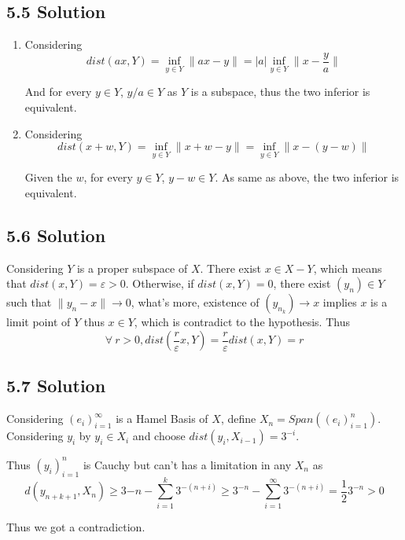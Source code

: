 \documentclass{article}
\begin{document}
\subsection*{5.5 Solution}
\begin{enumerate}
\item Considering 
\[dist(ax, Y) = \inf_{y \in Y} \|ax - y\| = |a| \inf_{y \in Y} \|x - \frac{y}{a}\|\]

And for every \(y \in Y\), \(y/a \in Y\) as \(Y\) is a subspace, thus the two inferior is equivalent. 

\item Considering
\[dist(x + w, Y) = \inf_{y \in Y}\|x + w - y\| = \inf_{y \in Y}\|x - (y - w)\|\]

Given the \(w\), for every \(y \in Y\), \(y - w \in Y\). As same as above, the two inferior is equivalent.


\end{enumerate}


\subsection*{5.6 Solution}
Considering \(Y\) is a proper subspace of \(X\). There exist \(x \in X - Y\), which means that \(dist(x, Y) = \varepsilon > 0\). Otherwise, if \(dist(x, Y) = 0\), there exist \((y_n) \in Y\) such that \(\|y_n - x\| \to 0\), what's more, existence of \((y_{n_k}) \to x\) implies \(x\) is a limit point of \(Y\) thus \(x \in Y\), which is contradict to the hypothesis. Thus 
\[\forall\ r > 0, dist(\frac{r}{\varepsilon}x, Y) = \frac{r}{\varepsilon}dist(x, Y) = r\]

\subsection*{5.7 Solution}
Considering \((e_i)_{i = 1}^\infty\) is a Hamel Basis of \(X\), define \(X_n = Span((e_i)_{i = 1}^n)\). Considering \(y_i\) by \(y_i \in X_i\) and choose \(dist(y_i, X_{i - 1}) = 3^{-i}\). 

Thus \((y_i)_{i = 1}^n\) is Cauchy but can't has a limitation in any \(X_n\) as 
\[d(y_{n + k + 1}, X_n) \ge 3{-n} - \sum_{i = 1}^k 3^{-(n + i)} \ge 3^{-n} - \sum_{i = 1}^\infty 3^{-(n + i)} = \frac{1}{2} 3^{-n} > 0\]

Thus we got a contradiction.
\end{document}

